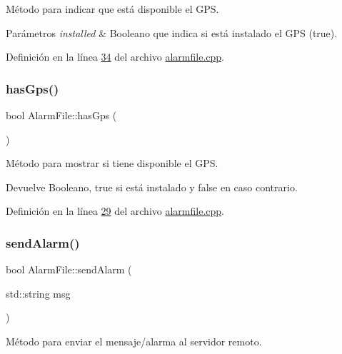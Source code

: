 Método para indicar que está disponible el G\+PS. 


\begin{DoxyParams}{Parámetros}
{\em installed} & Booleano que indica si está instalado el G\+PS (true). \\
\hline
\end{DoxyParams}


Definición en la línea \hyperlink{alarmfile_8cpp_source_l00034}{34} del archivo \hyperlink{alarmfile_8cpp_source}{alarmfile.\+cpp}.

\mbox{\label{classAlarmFile_ad75728f6e44f38772372b991f21d9caa}} 
\subsubsection{\texorpdfstring{has\+Gps()}{hasGps()}}
{\footnotesize\ttfamily bool Alarm\+File\+::has\+Gps (\begin{DoxyParamCaption}{ }\end{DoxyParamCaption})}



Método para mostrar si tiene disponible el G\+PS. 

\begin{DoxyReturn}{Devuelve}
Booleano, true si está instalado y false en caso contrario. 
\end{DoxyReturn}


Definición en la línea \hyperlink{alarmfile_8cpp_source_l00029}{29} del archivo \hyperlink{alarmfile_8cpp_source}{alarmfile.\+cpp}.

\mbox{\label{classAlarmFile_a37fd701cca3c3458a3009b508383947b}} 
\subsubsection{\texorpdfstring{send\+Alarm()}{sendAlarm()}}
{\footnotesize\ttfamily bool Alarm\+File\+::send\+Alarm (\begin{DoxyParamCaption}\item[{std\+::string}]{msg }\end{DoxyParamCaption})}



Método para enviar el mensaje/alarma al servidor remoto. 



